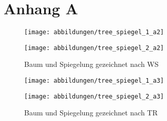 \chapter{Anhang A}
\label{chap:anhang_a}

\begin{figure}[ht]
    \centering
    \begin{minipage}[t]{0.45\linewidth}
        \centering
        \texttt{[image: abbildungen/tree\_spiegel\_1\_a2]}
    \end{minipage}
    \hfill
    \begin{minipage}[t]{0.45\linewidth}
        \centering
        \texttt{[image: abbildungen/tree\_spiegel\_2\_a2]}
    \end{minipage} 
    \caption[]{Baum und Spiegelung gezeichnet nach WS}
    \label{pic:WS_Spiegel}
\end{figure}

\begin{figure}[ht]
    \centering
    \begin{minipage}[t]{0.45\linewidth}
        \centering
        \texttt{[image: abbildungen/tree\_spiegel\_1\_a3]}
    \end{minipage}
    \hfill
    \begin{minipage}[t]{0.45\linewidth}
        \centering
        \texttt{[image: abbildungen/tree\_spiegel\_2\_a3]}   
    \end{minipage}  
    \caption[]{Baum und Spiegelung gezeichnet nach TR}
    \label{pic:TR_Spiegel}
\end{figure}
